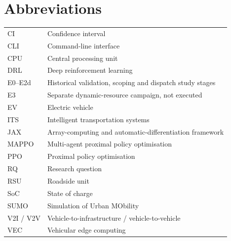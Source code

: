 \documentclass[12pt,a4paper]{article}
\begin{document}
\section*{Abbreviations}
\begin{tabularx}{\textwidth}{@{}lX@{}}
CI & Confidence interval\\
CLI & Command-line interface\\
CPU & Central processing unit\\
DRL & Deep reinforcement learning\\
E0--E2d & Historical validation, scoping and dispatch study stages\\
E3 & Separate dynamic-resource campaign, not executed\\
EV & Electric vehicle\\
ITS & Intelligent transportation systems\\
JAX & Array-computing and automatic-differentiation framework\\
MAPPO & Multi-agent proximal policy optimisation\\
PPO & Proximal policy optimisation\\
RQ & Research question\\
RSU & Roadside unit\\
SoC & State of charge\\
SUMO & Simulation of Urban MObility\\
V2I / V2V & Vehicle-to-infrastructure / vehicle-to-vehicle\\
VEC & Vehicular edge computing\\
\end{tabularx}
\clearpage
\end{document}

